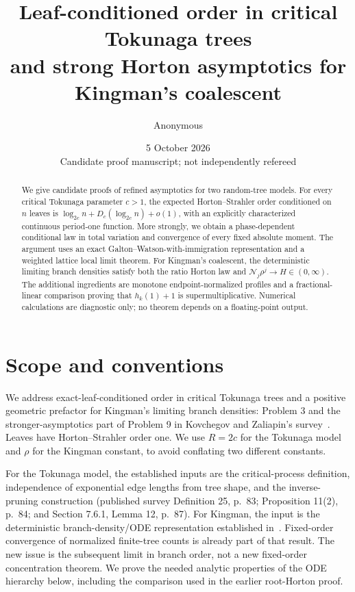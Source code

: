 \documentclass[11pt,a4paper]{article}
\title{Leaf-conditioned order in critical Tokunaga trees\\and strong Horton asymptotics for Kingman's coalescent}
\author{Anonymous}
\date{5 October 2026\\\small Candidate proof manuscript; not independently refereed}
\theoremstyle{remark}\newtheorem{remark}[theorem]{Remark}
\newcommand{\NN}{\mathcal N}
\begin{document}
\maketitle
\begin{abstract}
We give candidate proofs of refined asymptotics for two random-tree models. For every critical Tokunaga parameter $c>1$, the expected Horton--Strahler order conditioned on $n$ leaves is $\log_{2c}n+D_c(\log_{2c}n)+o(1)$, with an explicitly characterized continuous period-one function. More strongly, we obtain a phase-dependent conditional law in total variation and convergence of every fixed absolute moment. The argument uses an exact Galton--Watson-with-immigration representation and a weighted lattice local limit theorem. For Kingman's coalescent, the deterministic limiting branch densities satisfy both the ratio Horton law and $\NN_j\rho^j\to H\in(0,\infty)$. The additional ingredients are monotone endpoint-normalized profiles and a fractional-linear comparison proving that $h_k(1)+1$ is supermultiplicative. Numerical calculations are diagnostic only; no theorem depends on a floating-point output.
\end{abstract}

\section{Scope and conventions}
We address exact-leaf-conditioned order in critical Tokunaga trees and a positive geometric prefactor for Kingman's limiting branch densities: Problem 3 and the stronger-asymptotics part of Problem 9 in Kovchegov and Zaliapin's survey~\cite{KZ2020}. Leaves have Horton--Strahler order one. We use $R=2c$ for the Tokunaga model and $\rho$ for the Kingman constant, to avoid conflating two different constants.

For the Tokunaga model, the established inputs are the critical-process definition, independence of exponential edge lengths from tree shape, and the inverse-pruning construction (published survey Definition 25, p.~83; Proposition 11(2), p.~84; and Section 7.6.1, Lemma 12, p.~87). For Kingman, the input is the deterministic branch-density/ODE representation established in~\cite{KZ2017}. Fixed-order convergence of normalized finite-tree counts is already part of that result. The new issue is the subsequent limit in branch order, not a new fixed-order concentration theorem. We prove the needed analytic properties of the ODE hierarchy below, including the comparison used in the earlier root-Horton proof.
\end{document}

